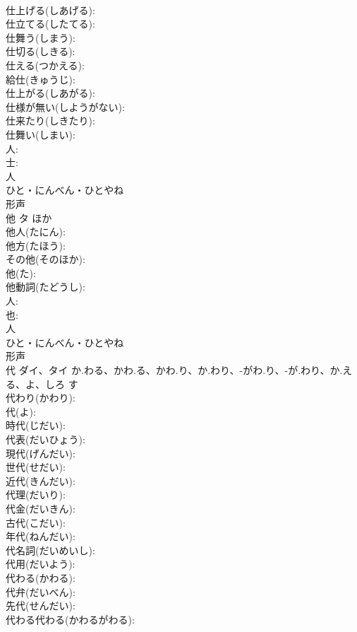 \documentclass[8pt]{extreport}
\begin{document}
\begin{CJK}{UTF8}{min}
\\	仕上げる(しあげる): 
\\	仕立てる(したてる): 
\\	仕舞う(しまう): 
\\	仕切る(しきる): 
\\	仕える(つかえる): 
\\	給仕(きゅうじ): 
\\	仕上がる(しあがる): 
\\	仕様が無い(しようがない): 
\\	仕来たり(しきたり): 
\\	仕舞い(しまい): 
\\	人: 
\\	士: 
\\	人	
\\	ひと・にんべん・ひとやね	
\\	形声 
\\	他	タ	ほか		
\\	他人(たにん): 
\\	他方(たほう): 
\\	その他(そのほか): 
\\	他(た): 
\\	他動詞(たどうし): 
\\	人: 
\\	也: 
\\	人	
\\	ひと・にんべん・ひとやね	
\\	形声 
\\	代	ダイ、タイ	か.わる、かわ.る、かわ.り、か.わり、-がわ.り、-が.わり、か.える、よ、しろ	す	
\\	代わり(かわり): 
\\	代(よ): 
\\	時代(じだい): 
\\	代表(だいひょう): 
\\	現代(げんだい): 
\\	世代(せだい): 
\\	近代(きんだい): 
\\	代理(だいり): 
\\	代金(だいきん): 
\\	古代(こだい): 
\\	年代(ねんだい): 
\\	代名詞(だいめいし): 
\\	代用(だいよう): 
\\	代わる(かわる): 
\\	代弁(だいべん): 
\\	先代(せんだい): 
\\	代わる代わる(かわるがわる): 

\end{CJK}
\end{document}
